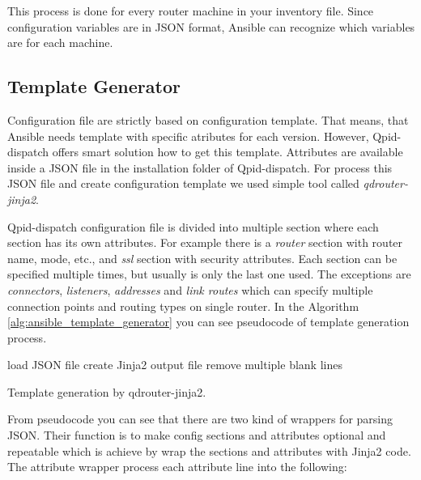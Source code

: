 This process is done for every router machine in your inventory file. Since configuration variables are in JSON format, Ansible can recognize which variables are for each machine.


\subsection{Template Generator}
Configuration file are strictly based on configuration template. That means, that Ansible needs template with specific atributes for each version. However, Qpid-dispatch offers smart solution how to get this template. Attributes are available inside a JSON file in the installation folder of Qpid-dispatch. For process this JSON file and create configuration template we used simple tool called \emph{qdrouter-jinja2}\footnotemark.

Qpid-dispatch configuration file is divided into multiple section where each section has its own attributes. For example there is a \emph{router} section with router name, mode, etc., and \emph{ssl} section with security attributes. Each section can be specified multiple times, but usually is only the last one used. The exceptions are \emph{connectors}, \emph{listeners}, \emph{addresses} and \emph{link routes} which can specify multiple connection points and routing types on single router. In the Algorithm \ref{alg:ansible_template_generator} you can see pseudocode of template generation process.

\begin{center}
	\begin{algorithm}[H]
		 load JSON file\;
		 create Jinja2 output file\;
		 remove multiple blank lines\;
		 \caption{Template generation by qdrouter-jinja2.}
		 \label{alg:ansible_template_generator}
	\end{algorithm}
\end{center}

From pseudocode you can see that there are two kind of wrappers for parsing JSON. Their function is to make config sections and attributes optional and repeatable which is achieve by wrap the sections and attributes with Jinja2 code. The attribute wrapper process each attribute line into the following:

